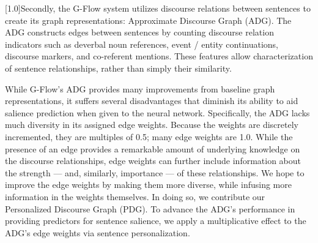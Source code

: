 \documentclass[11pt,a4paper]{article}
\begin{document}
\scalebox{0.974}[1.0]{Secondly, the G-Flow system} \cite{christensen2013towards} utilizes discourse relations between sentences to create its graph representations: Approximate Discourse Graph (ADG).
The ADG constructs edges between sentences by counting discourse relation indicators such as deverbal noun references, event \!/\! entity continuations, discourse markers, and co-referent mentions. These features allow characterization of sentence relationships, rather than simply their similarity.


While G-Flow's ADG provides many improvements from baseline graph representations, it suffers several disadvantages that diminish its ability to aid
salience prediction when given to the neural network. Specifically, the ADG lacks much diversity in its assigned edge weights. Because the weights are discretely incremented, 
they are multiples of 0.5; many edge weights are 1.0. While the presence of an edge provides a remarkable amount of underlying knowledge on the discourse relationships, edge weights can further include information about the strength 
--- and, similarly, importance --- 
of these relationships. We hope to improve the edge weights by making them more diverse, while infusing more information in the weights themselves. In doing so, we contribute our Personalized Discourse Graph (PDG).
To advance the ADG's performance in providing predictors for sentence salience, we apply a multiplicative effect to the ADG's edge weights via sentence personalization. 
\end{document}
